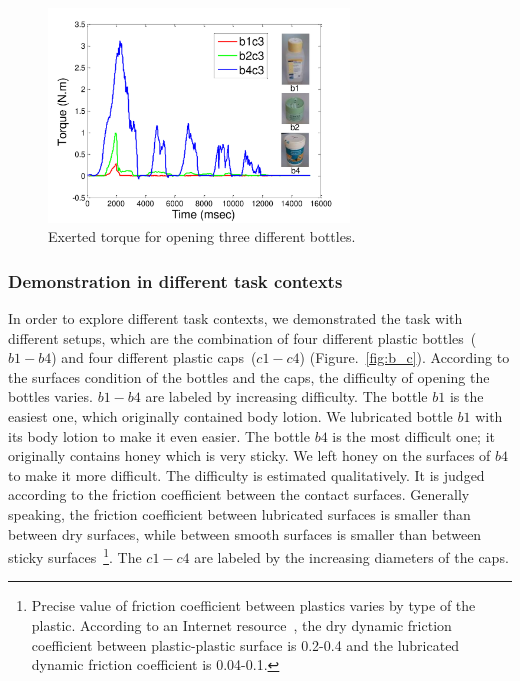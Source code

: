 \begin{figure}
  \centering
  \includegraphics[width=8cm]{./fig/b1b2b4_time_T.pdf}
  \caption{ \scriptsize{Exerted torque for opening three different bottles.}
}
\label{fig:bottlepatterns}
\end{figure}


\subsubsection{Demonstration in different task contexts}
\label{sec:exp_context}
In order to explore
different task contexts, we demonstrated the task with different
setups, which are the combination of four different plastic
bottles~($b1-b4$) and four different plastic caps~($c1-c4$)
(Figure.~\ref{fig:b_c}). According to the surfaces condition of the
bottles and the caps, the difficulty of opening the bottles
varies. $b1-b4$ are labeled by increasing difficulty. The bottle $b1$
is the easiest one, which originally contained body lotion. We
lubricated bottle $b1$ with its body lotion to make it even easier. The
bottle $b4$ is the most difficult one; it originally contains honey
which is very sticky. We left honey on the surfaces of $b4$ to make
it more difficult. The difficulty is estimated qualitatively. It is
judged according to the friction coefficient between the contact
surfaces. Generally speaking, the friction coefficient between
lubricated surfaces is smaller than between dry surfaces, while
between smooth surfaces is smaller than between sticky
surfaces~\footnote{Precise value of friction coefficient between
  plastics varies by type of the plastic. According to an Internet
  resource~\citep{FOC}, the dry dynamic friction coefficient between
  plastic-plastic surface is 0.2-0.4 and the lubricated dynamic
  friction coefficient is 0.04-0.1.}. The $c1-c4$ are labeled by the increasing diameters of the caps.


